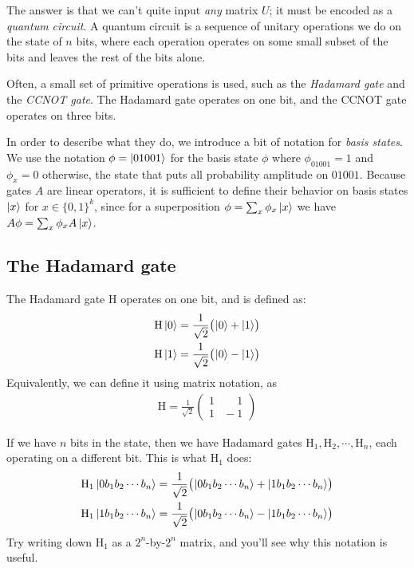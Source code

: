 The answer is that we can't quite input \emph{any} matrix $U$; it must be encoded as a \emph{quantum circuit}.
A quantum circuit is a sequence of unitary operations we do on the state of $n$ bits, where each operation operates on some small subset of the bits and leaves the rest of the bits alone.

Often, a small set of primitive operations is used, such as the \emph{Hadamard gate} and the \emph{CCNOT gate}.
The Hadamard gate operates on one bit, and the CCNOT gate operates on three bits.

In order to describe what they do, we introduce a bit of notation for \emph{basis states}.
We use the notation $\phi = \ket{01001}$ for the basis state $\phi$ where $\phi_{01001} = 1$ and $\phi_x = 0$ otherwise, \ie the state that puts all probability amplitude on $01001$.
Because gates $A$ are linear operators, it is sufficient to define their behavior on basis states $\ket{x}$ for $x \in \{0,1\}^k$,
since for a superposition $\phi = \sum_x \phi_x \ket{x}$ we have $A\phi = \sum_x \phi_x A \ket{x}$.

\subsection{The Hadamard gate}

\newcommand{\Ha}{\mathrm{H}}
\newcommand{\CCNOT}{\mathrm{CCNOT}}
\newcommand{\kets}[1]{\big(\kern-0.1em #1\!\big)}

The Hadamard gate $\Ha$ operates on one bit, and is defined as:
\begin{align*}
  \Ha\ket{0} = \frac{1}{\sqrt{2}}\kets{\ket{0} + \ket{1}} \\
  \Ha\ket{1} = \frac{1}{\sqrt{2}}\kets{\ket{0} - \ket{1}}
\end{align*}
Equivalently, we can define it using matrix notation, as
\begin{align*}
  \Ha = \frac{1}{\sqrt{2}}\begin{pmatrix}
    1 & \!\!\!\phantom{-}1 \\
    1 & \!\!\!-1
  \end{pmatrix}
\end{align*}

If we have $n$ bits in the state, then we have Hadamard gates $\Ha_1, \Ha_2, \cdots, \Ha_n$, each operating on a different bit.
This is what $\Ha_1$ does:
\begin{align}
  \Ha_1 \ket{0 b_1 b_2 \cdots b_n} = \frac{1}{\sqrt{2}}\kets{\ket{0 b_1 b_2 \cdots b_n} + \ket{1 b_1 b_2 \cdots b_n}} \label{eqn:hadamard}\\
  \Ha_1 \ket{1 b_1 b_2 \cdots b_n} = \frac{1}{\sqrt{2}}\kets{\ket{0 b_1 b_2 \cdots b_n} - \ket{1 b_1 b_2 \cdots b_n}}
\end{align}
Try writing down $\Ha_1$ as a $2^n$-by-$2^n$ matrix, and you'll see why this notation is useful.

